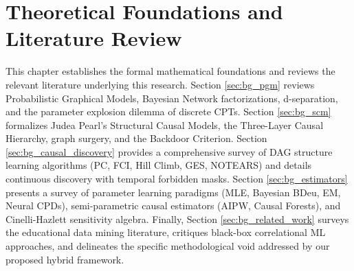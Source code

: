 \chapter{Theoretical Foundations and Literature Review}
\label{chap:background}

This chapter establishes the formal mathematical foundations and reviews the relevant literature underlying this research. Section \ref{sec:bg_pgm} reviews Probabilistic Graphical Models, Bayesian Network factorizations, d-separation, and the parameter explosion dilemma of discrete CPTs. Section \ref{sec:bg_scm} formalizes Judea Pearl's Structural Causal Models, the Three-Layer Causal Hierarchy, graph surgery, and the Backdoor Criterion. Section \ref{sec:bg_causal_discovery} provides a comprehensive survey of DAG structure learning algorithms (PC, FCI, Hill Climb, GES, NOTEARS) and details continuous discovery with temporal forbidden masks. Section \ref{sec:bg_estimators} presents a survey of parameter learning paradigms (MLE, Bayesian BDeu, EM, Neural CPDs), semi-parametric causal estimators (AIPW, Causal Forests), and Cinelli-Hazlett sensitivity algebra. Finally, Section \ref{sec:bg_related_work} surveys the educational data mining literature, critiques black-box correlational ML approaches, and delineates the specific methodological void addressed by our proposed hybrid framework.







